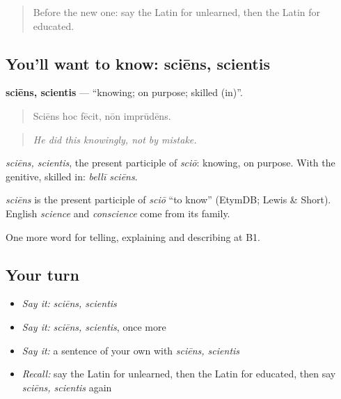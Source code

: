 \label{lesson:LA-C403-sciens}



\begin{quote}
Before the new one: say the Latin for unlearned, then the Latin for educated.
\end{quote}

\subsection*{You'll want to know: sciēns, scientis}
\textbf{sciēns, scientis} — \textquotedblleft{}knowing; on purpose; skilled (in)\textquotedblright{}.

\begin{quote}
Sciēns hoc fēcit, nōn imprūdēns.
\end{quote}

\begin{quote}
\emph{He did this knowingly, not by mistake.}
\end{quote}

\emph{sciēns, scientis}, the present participle of \emph{sciō}: knowing, on purpose. With the genitive, skilled in: \emph{bellī sciēns}.

\begin{cousinweb}
\emph{sciēns} is the present participle of \emph{sciō} \textquotedblleft{}to know\textquotedblright{} (EtymDB; Lewis \& Short). English \emph{science} and \emph{conscience} come from its family.
\end{cousinweb}

\begin{grammarlens}[title={What you've built}]
One more word for telling, explaining and describing at B1.
\end{grammarlens}

\subsection*{Your turn}
\begin{itemize}
\raggedright
  \item \emph{Say it:} \emph{sciēns, scientis}
  \item \emph{Say it:} \emph{sciēns, scientis}, once more
  \item \emph{Say it:} a sentence of your own with \emph{sciēns, scientis}
  \item \emph{Recall:} say the Latin for unlearned, then the Latin for educated, then say \emph{sciēns, scientis} again
\end{itemize}

